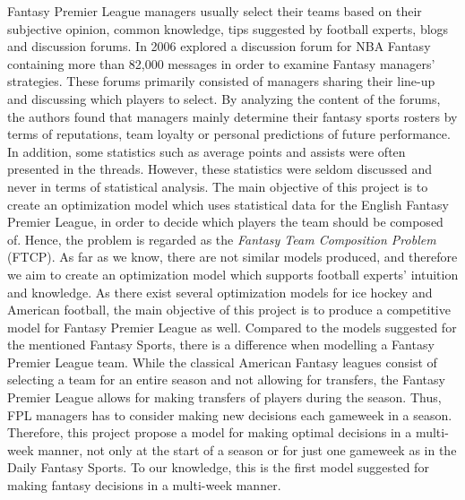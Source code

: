 \newpar
Fantasy Premier League managers usually select their teams based on their subjective opinion, common knowledge, tips suggested by football experts, blogs and discussion forums. In 2006 \cite{Smith} explored a discussion forum for NBA  Fantasy containing more than 82,000 messages in order to examine Fantasy managers' strategies. These forums primarily consisted of managers sharing their line-up and discussing which players to select. By analyzing the content of the forums, the authors found that managers mainly determine their fantasy sports rosters by terms of reputations, team loyalty or personal predictions of future performance. In addition, some statistics such as average points and assists were often presented in the threads. However, these statistics were seldom discussed and never in terms of statistical analysis. 
\newpar
The main objective of this project is to create an optimization model which uses statistical data for the English Fantasy Premier League, in order to decide which players the team should be composed of. Hence, the problem is regarded as the \textit{Fantasy Team Composition Problem} (FTCP). As far as we know, there are not similar models produced, and therefore we aim to create an optimization model which supports football experts' intuition and knowledge.
\newpar
As there exist several optimization models for ice hockey \citep{drafting_hockey_pools} and American football\citep{Fry}, the main objective of this project is to produce a competitive model for Fantasy Premier League as well. Compared to the models suggested for the mentioned Fantasy Sports, there is a difference when modelling a Fantasy Premier League team. While the classical American Fantasy leagues consist of selecting a team for an entire season and not allowing for transfers, the Fantasy Premier League allows for making transfers of players during the season. Thus, FPL managers has to consider making new decisions each gameweek in a season. Therefore, this project propose a model for making optimal decisions in a multi-week manner, not only at the start of a season or for just one gameweek as in the Daily Fantasy Sports. To our knowledge, this is the first model suggested for making fantasy decisions in a multi-week manner.
\newpar
